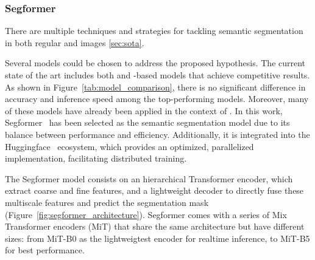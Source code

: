 \subsubsection{Segformer}
There are multiple techniques and strategies for tackling semantic segmentation in both regular and  images \ref{sec:sota}.  

Several models could be chosen to address the proposed hypothesis. The current state of the art includes both  and -based models that achieve competitive results. As shown in Figure~\ref{tab:model_comparison}, there is no significant difference in accuracy and inference speed among the top-performing models. Moreover, many of these models have already been applied in the context of . In this work, Segformer~\cite{segformer} has been selected as the semantic segmentation model due to its balance between performance and efficiency. Additionally, it is integrated into the Huggingface~\cite{huggingface} ecosystem, which provides an optimized, parallelized implementation, facilitating distributed training.  

\begin{table}[h]
    \centering
    \caption{Comparison of different models. Results are obtained from \cite{DDRNet} \cite{PIDNet} \cite{segformer}.  }
    \label{tab:model_comparison}
\end{table}


The Segformer model consists on an hierarchical Transformer  encoder, which extract coarse and fine features, and a lightweight  decoder to directly fuse these multiscale features and predict the segmentation mask (Figure~\ref{fig:segformer_architecture}). Segformer comes with a series of Mix Transformer encoders (MiT) that share the same architecture but have different sizes: from MiT-B0 as the lightweigtest encoder for realtime inference, to MiT-B5 for best performance.

